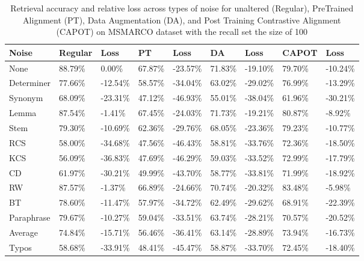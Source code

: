 \begin{table*}[!ht]
    \centering
    
    \begin{tabular}{|l|l|l|l|l|l|l|l|l|}
    \hline
        Noise & Regular & Loss & PT & Loss & DA & Loss & CAPOT & Loss \\ \hline
        None & 88.79\% & 0.00\% & 67.87\% & -23.57\% & 71.83\% & -19.10\% & 79.70\% & -10.24\% \\ \hline
        Determiner & 77.66\% & -12.54\% & 58.57\% & -34.04\% & 63.02\% & -29.02\% & 76.99\% & -13.29\% \\ \hline
        Synonym & 68.09\% & -23.31\% & 47.12\% & -46.93\% & 55.01\% & -38.04\% & 61.96\% & -30.21\% \\ \hline
        Lemma & 87.54\% & -1.41\% & 67.45\% & -24.03\% & 71.73\% & -19.21\% & 80.87\% & -8.92\% \\ \hline
        Stem & 79.30\% & -10.69\% & 62.36\% & -29.76\% & 68.05\% & -23.36\% & 79.23\% & -10.77\% \\ \hline
        RCS & 58.00\% & -34.68\% & 47.56\% & -46.43\% & 58.81\% & -33.76\% & 72.36\% & -18.50\% \\ \hline
        KCS & 56.09\% & -36.83\% & 47.69\% & -46.29\% & 59.03\% & -33.52\% & 72.99\% & -17.79\% \\ \hline
        CD & 61.97\% & -30.21\% & 49.99\% & -43.70\% & 58.77\% & -33.81\% & 71.99\% & -18.92\% \\ \hline
        RW & 87.57\% & -1.37\% & 66.89\% & -24.66\% & 70.74\% & -20.32\% & 83.48\% & -5.98\% \\ \hline
        BT & 78.60\% & -11.47\% & 57.97\% & -34.72\% & 62.49\% & -29.62\% & 68.91\% & -22.39\% \\ \hline
        Paraphrase & 79.67\% & -10.27\% & 59.04\% & -33.51\% & 63.74\% & -28.21\% & 70.57\% & -20.52\% \\ \hline
        Average & 74.84\% & -15.71\% & 56.46\% & -36.41\% & 63.14\% & -28.89\% & 73.94\% & -16.73\% \\ \hline
        Typos & 58.68\% & -33.91\% & 48.41\% & -45.47\% & 58.87\% & -33.70\% & 72.45\% & -18.40\% \\ \hline
    \end{tabular}
    \caption{Retrieval accuracy and relative loss across types of noise for unaltered (Regular), PreTrained Alignment (PT),  Data Augmentation (DA), and Post Training Contrastive Alignment (CAPOT) on MSMARCO dataset with the recall set the size of 100}
    \label{tab:capot-msmarco-100}
\end{table*}
